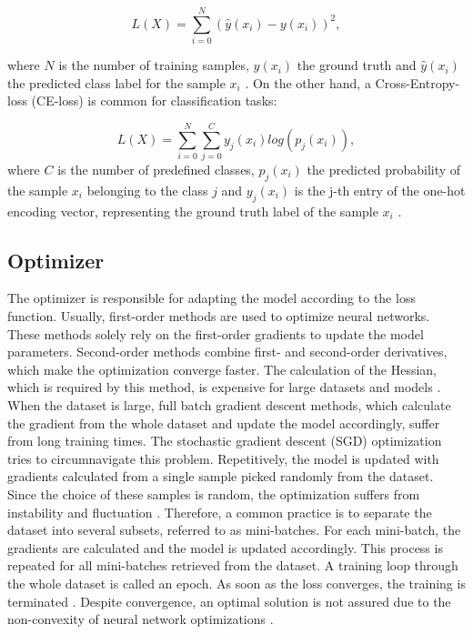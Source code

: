\begin{equation}
L(X) =  \sum_{i=0}^{N}(\hat{y}(x_{i})-y(x_{i}))^2,
\end{equation}

where $N$ is the number of training samples, $y(x_{i})$ the ground truth and $\hat{y}(x_{i})$ the predicted class label for the sample $x_{i}$ \cite{Calin2020}. On the other hand, a Cross-Entropy-loss (CE-loss) is common for classification tasks: 

\begin{equation}
L(X) = \sum_{i=0}^{N} \sum_{j=0}^{C} y_{j}(x_{i}) log(p_{j}(x_{i})),
\end{equation}
where $C$ is the number of predefined classes, $p_{j}(x_{i})$ the predicted probability of the sample $x_{i}$ belonging to the class $j$ and $y_{j}(x_{i})$ is the j-th entry of the one-hot encoding vector, representing the ground truth label of the sample $x_{i}$ \cite{ShilohPerl2020}.



\subsection{Optimizer}
The optimizer is responsible for adapting the model according to the loss function. Usually, first-order methods are used to optimize neural networks. These methods solely rely on the first-order gradients to update the model parameters. Second-order methods combine first- and second-order derivatives, which make the optimization converge faster. The calculation of the Hessian, which is required by this method, is expensive for large datasets and models \cite{Calin2020}\cite{ShilohPerl2020}. When the dataset is large, full batch gradient descent methods, which calculate the gradient from the whole dataset and update the model accordingly, suffer from long training times. The stochastic gradient descent (SGD) optimization tries to circumnavigate this problem. Repetitively, the model is updated with gradients calculated from a single sample picked randomly from the dataset. Since the choice of these samples is random, the optimization suffers from instability and fluctuation \cite{ShilohPerl2020}. Therefore, a common practice is to separate the dataset into several subsets, referred to as mini-batches. For each mini-batch, the gradients are calculated and the model is updated accordingly. This process is repeated for all mini-batches retrieved from the dataset. A training loop through the whole dataset is called an epoch. As soon as the loss converges, the training is terminated \cite{ShilohPerl2020}. Despite convergence, an optimal solution is not assured due to the non-convexity of neural network optimizations \cite{ShilohPerl2020}.

